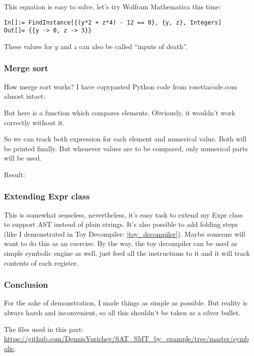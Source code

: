 This equation is easy to solve, let's try Wolfram Mathematica this time:

\begin{lstlisting}
In[]:= FindInstance[{(y*2 + z*4) - 12 == 0}, {y, z}, Integers]
Out[]= {{y -> 0, z -> 3}}
\end{lstlisting}

These values for $y$ and $z$ can also be called ``inputs of death''.

\subsubsection{Merge sort}

How merge sort works?
I have copypasted Python code from rosettacode.com almost intact:



But here is a function which compares elements.
Obviously, it wouldn't work correctly without it.

So we can track both expression for each element and numerical value.
Both will be printed finally.
But whenever values are to be compared, only numerical parts will be used.

Result:



\subsubsection{Extending Expr class}

This is somewhat senseless, nevertheless, it's easy task to extend my Expr class to support \ac{AST} instead of
plain strings.
It's also possible to add folding steps (like I demonstrated in Toy Decompiler: \ref{toy_decompiler}).
Maybe someone will want to do this as an exercise.
By the way, the toy decompiler can be used as simple symbolic engine as well,
just feed all the instructions to it and it will track contents of each register.

\subsubsection{Conclusion}

For the sake of demonstration, I made things as simple as possible.
But reality is always harsh and inconvenient, so all this shouldn't be taken as a silver bullet.

The files used in this part: \url{https://github.com/DennisYurichev/SAT_SMT_by_example/tree/master/symbolic}.

